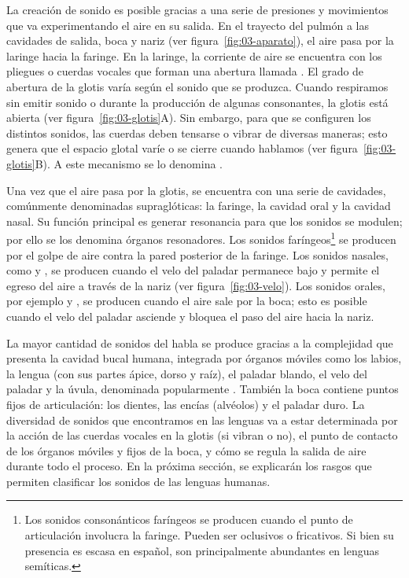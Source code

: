 La creación de sonido es posible gracias a una serie de presiones y movimientos
que va experimentando el aire en su salida. En el trayecto del pulmón a las
cavidades de salida, boca y nariz (ver figura~\ref{fig:03-aparato}), el aire
pasa por la laringe hacia la faringe. En la laringe, la corriente de aire se
encuentra con los pliegues o cuerdas vocales que forman una abertura llamada
. El grado de abertura de la glotis varía según el sonido que se
produzca. Cuando respiramos sin emitir sonido o durante la producción de algunas
consonantes, la glotis está abierta (ver figura~\ref{fig:03-glotis}A). Sin
embargo, para que se configuren los distintos sonidos, las cuerdas deben tensarse
o vibrar de diversas maneras; esto genera que el espacio glotal varíe o se cierre
cuando hablamos (ver figura~\ref{fig:03-glotis}B). A este mecanismo se lo
denomina .




Una vez que el aire pasa por la glotis, se encuentra con una serie de cavidades,
comúnmente denominadas supraglóticas: la faringe, la cavidad oral y la cavidad
nasal. Su función principal es generar resonancia para que los sonidos se
modulen; por ello se los denomina órganos resonadores. Los sonidos
faríngeos\footnote{Los sonidos consonánticos faríngeos se producen cuando el
punto de articulación involucra la faringe. Pueden ser oclusivos o fricativos.
Si bien su presencia es escasa en español, son principalmente abundantes en
lenguas semíticas.} se producen por el golpe de aire contra la pared posterior
de la faringe. Los sonidos nasales, como  y , se producen cuando el
velo del paladar permanece bajo y permite el egreso del aire a través de la nariz
(ver figura~\ref{fig:03-velo}). Los sonidos orales, por ejemplo  y
, se producen cuando el aire sale por la boca; esto es posible cuando el
velo del paladar asciende y bloquea el paso del aire hacia la nariz.

La mayor cantidad de sonidos del habla se produce gracias a la complejidad que
presenta la cavidad bucal humana, integrada por órganos móviles como los labios,
la lengua (con sus partes ápice, dorso y raíz), el paladar blando, el velo del
paladar y la úvula, denominada popularmente . También la boca
contiene puntos fijos de articulación: los dientes, las encías (alvéolos) y el
paladar duro. La diversidad de sonidos que encontramos en las lenguas va a estar
determinada por la acción de las cuerdas vocales en la glotis (si vibran o no),
el punto de contacto de los órganos móviles y fijos de la boca, y cómo se regula
la salida de aire durante todo el proceso. En la próxima sección, se explicarán
los rasgos que permiten clasificar los sonidos de las lenguas humanas.

